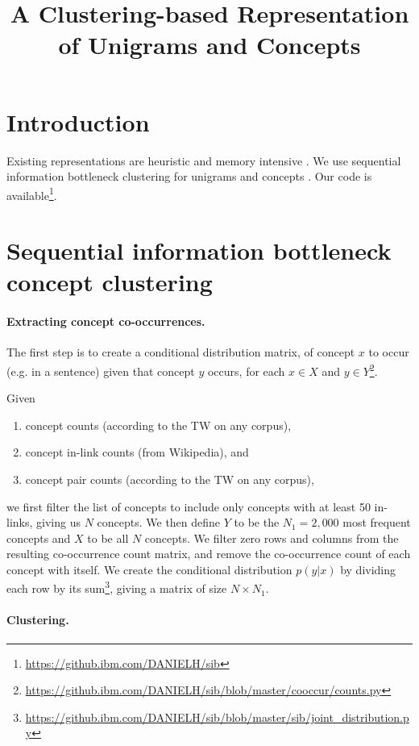\documentclass[11pt,a4paper]{article}
\title{A Clustering-based Representation of Unigrams and Concepts}
\date{}
\begin{document}
\maketitle


\section{Introduction}

Existing representations are heuristic and memory intensive
\cite{mikolov2013efficient,pennington2014glove}.
We use sequential information bottleneck clustering for unigrams and concepts
\cite{slonim2000document}.
Our code is available\footnote{\url{https://github.ibm.com/DANIELH/sib}}.

\section{Sequential information bottleneck concept clustering}

\paragraph{Extracting concept co-occurrences.}

The first step is to create a conditional distribution matrix,
of concept $x$ to occur (e.g. in a sentence) given that concept $y$ occurs, for each
$x\in X$ and
$y\in Y$\footnote{\url{https://github.ibm.com/DANIELH/sib/blob/master/cooccur/counts.py}}.

Given
\begin{enumerate}
\item concept counts (according to the TW on any corpus),
\item concept in-link counts (from Wikipedia), and
\item concept pair counts (according to the TW on any corpus),
\end{enumerate}
we first filter the list of concepts to include only concepts with at least 50
in-links,
giving us $N$ concepts.
We then define $Y$ to be the $N_1=2,000$ most frequent concepts
and $X$ to be all $N$ concepts.
We filter zero rows and columns from the resulting co-occurrence count matrix,
and remove the co-occurrence count of each concept with itself.
We create the conditional distribution $p(y|x)$ by dividing each row by its
sum\footnote{\url{https://github.ibm.com/DANIELH/sib/blob/master/sib/joint_distribution.py}},
giving a matrix of size $N\times N_1$.

\paragraph{Clustering.}
\end{document}
